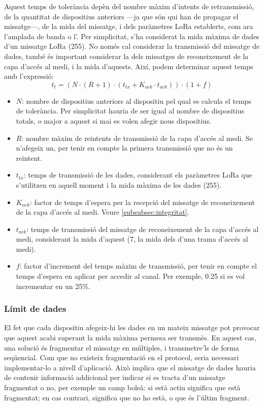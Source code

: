 \documentclass{tfgitic}[2024/07/01]
\begin{document}
{Aquest temps de tolerància depèn del nombre màxim d'intents de retransmissió, de la quantitat de dispositius anteriors ---ja que són qui han de propagar el missatge---, de la mida del missatge, i dels paràmetres LoRa establerts, com ara l'amplada de banda o l'. Per simplicitat, s'ha considerat la mida màxima de dades d'un missatge LoRa (\SI{255}{\byte}). No només cal considerar la transmissió del missatge de dades, també és important considerar la dels missatges de reconeixement de la capa d'accés al medi, i la mida d'aquests. Així, podem determinar aquest temps amb l'expressió:
\begin{equation}
    t_t =  (N \cdot (R+1) \cdot (t_{{tx}} + K_{{ack}} \cdot t_{{ack}})) \cdot (1 + f)
    \label{eq:app_tolerancia}
\end{equation}
\begin{itemize}
    \item $N$: nombre de dispositius anteriors al dispositiu pel qual es calcula el temps de tolerància. Per simplicitat hauria de ser igual al nombre de dispositius totals, o major a aquest si mai es volen afegir nous dispositius.
    \item $R$: nombre màxim de reintents de transmissió de la capa d'accés al medi. Se n'afegeix un, per tenir en compte la primera transmissió que no és un reintent.
    \item $t_{tx}$: temps de transmissió de les dades, considerant els paràmetres LoRa que s'utilitzen en aquell moment i la mida màxima de les dades (\SI{255}{\byte}).
    \item $K_{{ack}}$: factor de temps d'espera per la recepció del missatge de reconeixement de la capa d'accés al medi. Veure \autoref{subsubsec:integritat}.
    \item $t_{{ack}}$: temps de transmissió del missatge de reconeixement de la capa d'accés al medi, considerant la mida d'aquest (\SI{7}{\byte}, la mida dels  d'una trama d'accés al medi).
    \item $f$: factor d'increment del temps màxim de transmissió, per tenir en compte el temps d'espera en aplicar  per accedir al canal. Per exemple, 0.25 si es vol incrementar en un 25\%.
\end{itemize}

\subsubsection{Límit de dades}
El fet que cada dispositiu afegeix-hi les dades en un mateix missatge pot provocar que aquest acabi superant la mida màxima permesa ser transmès. En aquest cas, una solució és fragmentar el missatge en múltiples, i transmetre'ls de forma seqüencial. Com que no existeix fragmentació en el protocol, seria necessari implementar-lo a nivell d'aplicació. Això implica que el missatge de dades hauria de contenir informació addicional per indicar si es tracta d'un missatge fragmentat o no, per exemple un camp boleà: si està actiu significa que està fragmentat; en cas contrari, significa que no ho està, o que és l'últim fragment.
    
}
\end{document}
